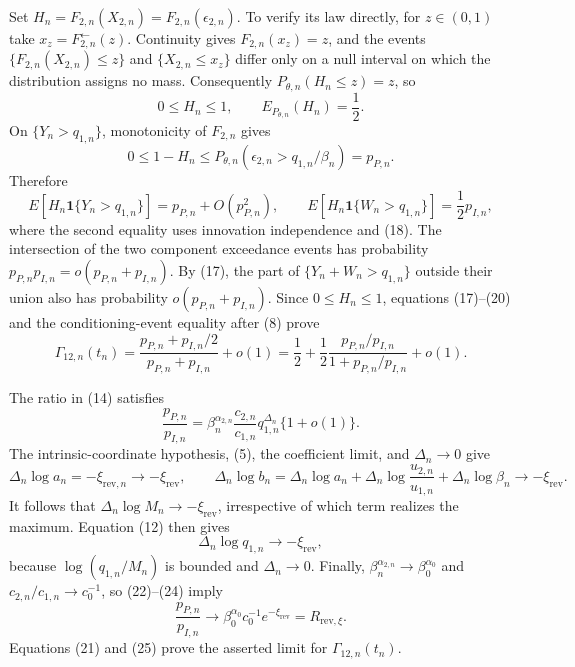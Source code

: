 Set \(H_n=F_{2,n}(X_{2,n})=F_{2,n}(\epsilon_{2,n})\). To verify its law
directly, for \(z\in(0,1)\) take
\(x_z=F_{2,n}^{\leftarrow}(z)\). Continuity gives \(F_{2,n}(x_z)=z\), and
the events \(\{F_{2,n}(X_{2,n})\leq z\}\) and \(\{X_{2,n}\leq x_z\}\)
differ only on a null interval on which the distribution assigns no mass.
Consequently \(P_{\theta,n}(H_n\leq z)=z\), so
\[
0\leq H_n\leq1,
\qquad
E_{P_{\theta,n}}(H_n)=\frac12.
\tag{18}
\]
On \(\{Y_n>q_{1,n}\}\), monotonicity of \(F_{2,n}\) gives
\[
0\leq1-H_n
\leq P_{\theta,n}(\epsilon_{2,n}>q_{1,n}/\beta_n)=p_{P,n}.
\tag{19}
\]
Therefore
\[
E[H_n\mathbf 1\{Y_n>q_{1,n}\}]
=p_{P,n}+O(p_{P,n}^2),
\qquad
E[H_n\mathbf 1\{W_n>q_{1,n}\}]
=\frac12p_{I,n},
\tag{20}
\]
where the second equality uses innovation independence and (18). The
intersection of the two component exceedance events has probability
\(p_{P,n}p_{I,n}=o(p_{P,n}+p_{I,n})\). By (17), the part of
\(\{Y_n+W_n>q_{1,n}\}\) outside their union also has probability
\(o(p_{P,n}+p_{I,n})\). Since \(0\leq H_n\leq1\), equations (17)--(20)
and the conditioning-event equality after (8) prove
\[
\Gamma_{12,n}(t_n)
=\frac{p_{P,n}+p_{I,n}/2}{p_{P,n}+p_{I,n}}+o(1)
=\frac12+\frac12\frac{p_{P,n}/p_{I,n}}{1+p_{P,n}/p_{I,n}}+o(1).
\tag{21}
\]

The ratio in (14) satisfies
\[
\frac{p_{P,n}}{p_{I,n}}
=\beta_n^{\alpha_{2,n}}\frac{c_{2,n}}{c_{1,n}}
q_{1,n}^{\Delta_n}\{1+o(1)\}.
\tag{22}
\]
The intrinsic-coordinate hypothesis, (5), the coefficient limit, and
\(\Delta_n\to0\) give
\[
\Delta_n\log a_n=-\xi_{\mathrm{rev},n}\to-\xi_{\mathrm{rev}},
\qquad
\Delta_n\log b_n
=\Delta_n\log a_n
+\Delta_n\log\frac{u_{2,n}}{u_{1,n}}
+\Delta_n\log\beta_n
\to-\xi_{\mathrm{rev}}.
\tag{23}
\]
It follows that \(\Delta_n\log M_n\to-\xi_{\mathrm{rev}}\), irrespective
of which term realizes the maximum. Equation (12) then gives
\[
\Delta_n\log q_{1,n}\longrightarrow-\xi_{\mathrm{rev}},
\tag{24}
\]
because \(\log(q_{1,n}/M_n)\) is bounded and \(\Delta_n\to0\). Finally,
\(\beta_n^{\alpha_{2,n}}\to\beta_0^{\alpha_0}\) and
\(c_{2,n}/c_{1,n}\to c_0^{-1}\), so (22)--(24) imply
\[
\frac{p_{P,n}}{p_{I,n}}
\longrightarrow
\beta_0^{\alpha_0}c_0^{-1}e^{-\xi_{\mathrm{rev}}}
=R_{\mathrm{rev},\xi}.
\tag{25}
\]
Equations (21) and (25) prove the asserted limit for
\(\Gamma_{12,n}(t_n)\).

